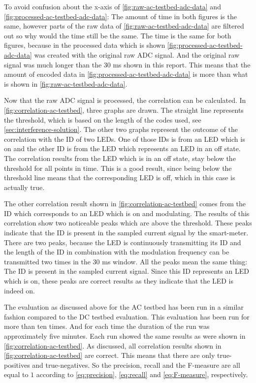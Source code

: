 To avoid confusion about the x-axis of \autoref{fig:raw-ac-testbed-adc-data} and \autoref{fig:processed-ac-testbed-adc-data}: The amount of time in both figures is the same, however parts of the raw data of \autoref{fig:raw-ac-testbed-adc-data} are filtered out so why would the time still be the same.
The time is the same for both figures, because in the processed data which is shown \autoref{fig:processed-ac-testbed-adc-data} was created with the original raw ADC signal.
And the original raw signal was much longer than the 30 ms shown in this report.
This means that the amount of encoded data in \autoref{fig:processed-ac-testbed-adc-data} is more than what is shown in \autoref{fig:raw-ac-testbed-adc-data}.


Now that the raw ADC signal is processed, the correlation can be calculated.
In \autoref{fig:correlation-ac-testbed}, three graphs are drawn.
The straight line represents the threshold, which is based on the length of the codes used, see \autoref{sec:interference-solution}.
The other two graphs represent the outcome of the correlation with the ID of two LEDs.
One of those IDs is from an LED which is on and the other ID is from the LED which represents an LED in an off state.
The correlation results from the LED which is in an off state, stay below the threshold for all points in time.
This is a good result, since being below the threshold line means that the corresponding LED is off, which in this case is actually true.

The other correlation result shown in \autoref{fig:correlation-ac-testbed} comes from the ID which corresponds to an LED which is on and modulating.
The results of this correlation show two noticeable peaks which are above the threshold.
These peaks indicate that the ID is present in the sampled current signal by the smart-meter.
There are two peaks, because the LED is continuously transmitting its ID and the length of the ID in combination with the modulation frequency can be transmitted two times in the 30 ms window.
All the peaks mean the same thing: The ID is present in the sampled current signal.
Since this ID represents an LED which is on, these peaks are correct results as they indicate that the LED is indeed on.

The evaluation as discussed above for the AC testbed has been run in a similar fashion compared to the DC testbed evaluation.
This evaluation  has been run for more than ten times.
And for each time the duration of the run was approximately five minutes.
Each run showed the same results as were shown in \autoref{fig:correlation-ac-testbed}.
As discussed, all correlation results shown in \autoref{fig:correlation-ac-testbed} are correct.
This means that there are only true-positives and true-negatives.
So the precision, recall and the F-measure are all equal to $1$ according to \autoref{eq:precision}, \autoref{eq:recall} and \autoref{eq:F-measure}, respectively.

